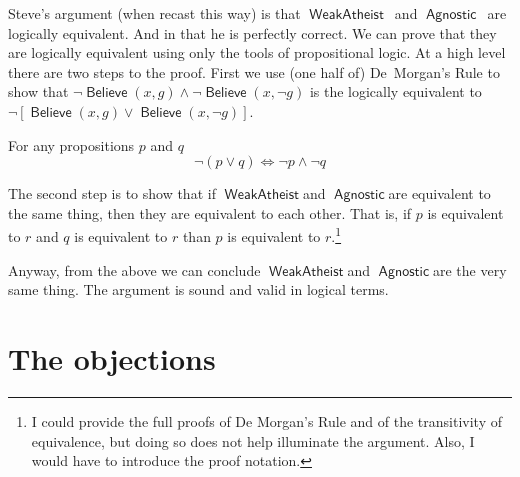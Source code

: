\documentclass[12pt]{article}
\providecommand{\land}{\wedge}
\providecommand{\lor}{\vee}
\providecommand{\liff}{\iff}
\providecommand{\lnot}{\neg}
\newcommand{\rel}[1]{\ensuremath{\mathop{\mathsf{#1}}}}
\newcommand{\rlbelieve}{\rel{Believe}}
\newcommand{\rlwa}{\rel{WeakAtheist}}
\newcommand{\rlagno}{\rel{Agnostic}}
\begin{document}
Steve's argument (when recast this way) is that \rlwa\ and \rlagno\ are logically equivalent.
And in that he is perfectly correct. We can prove that they are logically equivalent using only the tools of propositional logic.
At a high level there are two steps to the proof. First we use (one half of) De~Morgan's Rule to show that $\lnot \rlbelieve(x, g) \land \lnot\rlbelieve(x, \lnot g)$ is the logically equivalent to $\lnot\left[\rlbelieve(x, g) \lor \rlbelieve(x, \lnot g)\right]$.

\begin{theorem}
    For any propositions $p$ and $q$ 
    \[
        \lnot\left(p \lor q\right) \liff \lnot p \land \lnot q
    \]  
\end{theorem}


The second step is to show that if \rlwa and \rlagno are equivalent to the same thing, then they are equivalent to each other. That is, if $p$ is equivalent to $r$ and $q$ is equivalent to $r$ than $p$ is equivalent to $r$.\footnote{I could provide the full proofs of De Morgan's Rule and of the transitivity of equivalence, but doing so does not help illuminate the argument. Also, I would have to introduce the proof notation.}

Anyway, from the above we can conclude \rlwa and \rlagno are the very same thing. The argument is sound and valid in logical terms.

\section{The objections}

\end{document}
